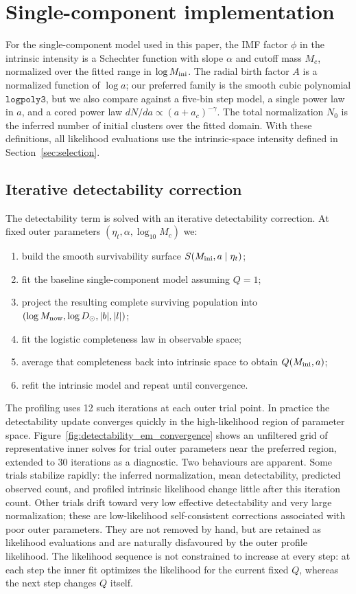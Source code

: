 \documentclass[fleqn,usenatbib]{mnras}
\begin{document}
\section{Single-component implementation}\label{sec:model_single}
For the single-component model used in this paper, the IMF factor $\phi$ in the intrinsic intensity is a Schechter function with slope $\alpha$ and cutoff mass $M_c$, normalized over the fitted range in $\log M_{\rm ini}$. The radial birth factor $A$ is a normalized function of $\log a$; our preferred family is the smooth cubic polynomial $\texttt{logpoly3}$, but we also compare against a five-bin step model, a single power law in $a$, and a cored power law $dN/da\propto(a+a_c)^{-\gamma}$. The total normalization $N_0$ is the inferred number of initial clusters over the fitted domain. With these definitions, all likelihood evaluations use the intrinsic-space intensity defined in Section~\ref{sec:selection}.

\subsection{Iterative detectability correction}\label{sec:detectability_algorithm}
The detectability term is solved with an iterative detectability correction. At fixed outer parameters $(\eta_t,\alpha,\log_{10}M_c)$ we:
\begin{enumerate}
    \item build the smooth survivability surface $S(M_{\rm ini},a\mid\eta_t)$;
    \item fit the baseline single-component model assuming $Q=1$;
    \item project the resulting complete surviving population into $(\log M_{\rm now}, \log D_\odot, |b|, |l|)$;
    \item fit the logistic completeness law in observable space;
    \item average that completeness back into intrinsic space to obtain $Q(M_{\rm ini},a)$;
    \item refit the intrinsic model and repeat until convergence.
\end{enumerate}
The profiling uses 12 such iterations at each outer trial point. In practice the detectability update converges quickly in the high-likelihood region of parameter space. Figure~\ref{fig:detectability_em_convergence} shows an unfiltered grid of representative inner solves for trial outer parameters near the preferred region, extended to 30 iterations as a diagnostic. Two behaviours are apparent. Some trials stabilize rapidly: the inferred normalization, mean detectability, predicted observed count, and profiled intrinsic likelihood change little after this iteration count. Other trials drift toward very low effective detectability and very large normalization; these are low-likelihood self-consistent corrections associated with poor outer parameters. They are not removed by hand, but are retained as likelihood evaluations and are naturally disfavoured by the outer profile likelihood. The likelihood sequence is not constrained to increase at every step: at each step the inner fit optimizes the likelihood for the current fixed $Q$, whereas the next step changes $Q$ itself.
\end{document}
